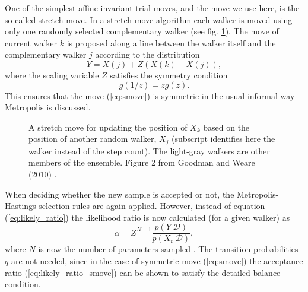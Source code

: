 \documentclass{wihuri}
\def\be{\begin{equation}}
\def\ee{\end{equation}}
\begin{document}



One of the simplest affine invariant trial moves, and the move we use here, is the so-called stretch-move. In a stretch-move algorithm each walker is moved using only one randomly selected complementary walker (see fig. \ref{fig:smove}). The move of current walker $k$ is proposed along a line between the walker itself and the complementary walker $j$ according to the distribution \cite{emceehammer}
\be \label{eq:smove}
Y = X(j) + Z(X(k)-X(j)),
\ee
where the scaling variable $Z$ satisfies the symmetry condition
\be \label{eq:symmetry_condition}
g(1/z) = zg(z).
\ee
This ensures that the move (\ref{eq:smove}) is symmetric in the usual informal way Metropolis is discussed.%


\begin{figure}
\centerline{}
\caption{A stretch move for updating the position of $X_{k}$ based on the position of another random walker, $X_{j}$ (subscript identifies here the walker instead of the step count). The light-gray walkers are other members of the ensemble. Figure 2 from Goodman and Weare (2010) \cite{ensemble1}.
\label{fig:smove}}
\end{figure}


When deciding whether the new sample is accepted or not, the Metropolis-Hastings selection rules are again applied. However, instead of equation (\ref{eq:likely_ratio}) the likelihood ratio is now calculated (for a given walker) as
\be \label{eq:likely_ratio_smove} 
\alpha = Z^{N-1}\frac{p(Y|\mathcal{D})}{p(X_{t}|\mathcal{D})},
\ee
where $N$ is now the number of parameters sampled \cite{emceehammer}. The transition probabilities $q$ are not needed, since in the case of symmetric move (\ref{eq:smove}) the acceptance ratio (\ref{eq:likely_ratio_smove}) can be shown to satisfy the detailed balance condition. 



\end{document}
